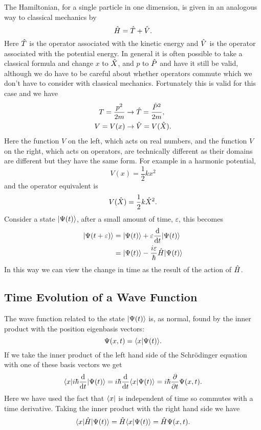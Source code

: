     The Hamiltonian, for a single particle in one dimension, is given in an analogous way to classical mechanics by
    \[\hat{H} = \hat{T} + \hat{V}.\]
    Here \(\hat{T}\) is the operator associated with the kinetic energy and \(\hat{V}\) is the operator associated with the potential energy.
    In general it is often possible to take a classical formula and change \(x\) to \(\hat{X}\), and \(p\) to \(\hat{P}\) and have it still be valid, although we do have to be careful about whether operators commute which we don't have to consider with classical mechanics.
    Fortunately this is valid for this case and we have
    \begin{align*}
        T = \frac{p^2}{2m} &\rightarrow \hat{T} = \frac{\hat{P}^2}{2m},\\
        V = V(x) &\rightarrow \hat{V} = V(\hat{X}).
    \end{align*}
    Here the function \(V\) on the left, which acts on real numbers, and the function \(V\) on the right, which acts on operators, are technically different as their domains are different but they have the same form.
    For example in a harmonic potential,
    \[V(x) = \frac{1}{2}kx^2\]
    and the operator equivalent is
    \[V(\hat{X}) = \frac{1}{2}k\hat{X}^2.\]
    Consider a state \(\vert {\Psi(t)} \rangle\), after a small amount of time, \(\varepsilon\), this becomes
    \begin{align*}
        \vert {\Psi(t + \varepsilon)} \rangle &= \vert {\Psi(t)} \rangle + \varepsilon\dv{t}\vert {\Psi(t)} \rangle\\
        &= \vert {\Psi(t)} \rangle - \frac{i\varepsilon}{\hbar}\hat{H}\vert {\Psi(t)} \rangle
    \end{align*}
    In this way we can view the change in time as the result of the action of \(\hat{H}\).
    
    \subsection{Time Evolution of a Wave Function}
    The wave function related to the state \(\vert {\Psi(t)} \rangle\) is, as normal, found by the inner product with the position eigenbasis vectors:
    \[\Psi(x, t) = \langle {x} \vert {\Psi(t)} \rangle.\]
    If we take the inner product of the left hand side of the Schr\"odinger equation with one of these basis vectors we get
    \[\langle {x} \vert i\hbar\dv{t}\vert {\Psi(t)} \rangle = i\hbar\dv{t}\langle {x} \vert {\Psi(t)} \rangle = i\hbar\pdv{t}\Psi(x, t).\]
    Here we have used the fact that \(\langle {x} \vert\) is independent of time so commutes with a time derivative.
    Taking the inner product with the right hand side we have
    \[\langle {x} \vert\hat{H}\vert {\Psi(t)} \rangle = \hat{H}\langle {x} \vert {\Psi(t)} \rangle = \hat{H}\Psi(x, t).\]
    
